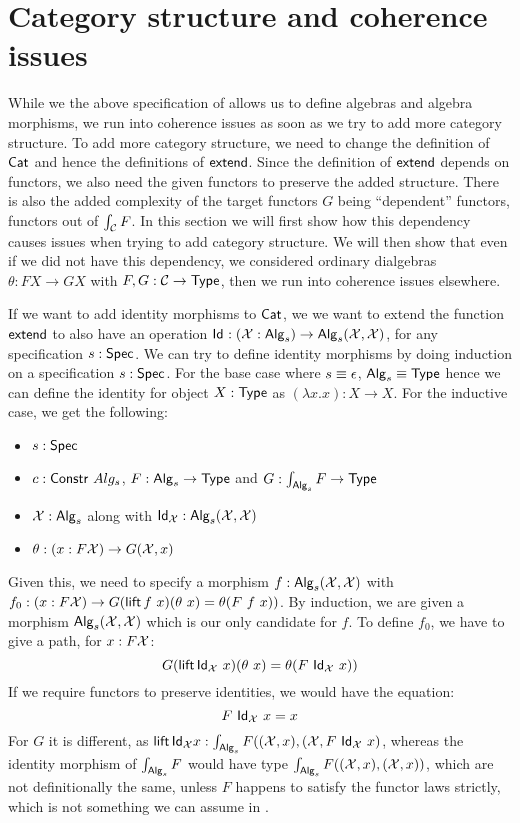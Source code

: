 \documentclass[a4paper,10pt]{report}
\begin{document}
\section{Category structure and coherence issues}
\label{sec:hitscategory}

While we the above specification of \hits allows us to define algebras
and algebra morphisms, we run into coherence issues as soon as we try
to add more category structure. To add more category structure, we
need to change the definition of $\mathsf{Cat}$ and hence the definitions of
$\mathsf{extend}$. Since the definition of $\mathsf{extend}$ depends on functors, we
also need the given functors to preserve the added structure. There is
also the added complexity of the target functors $G$ being
``dependent'' functors, \ie functors out of $\int_{\mathcal{C}} F$. In this
section we will first show how this dependency causes issues when
trying to add category structure. We will then show that even if we
did not have this dependency, \ie we considered ordinary dialgebras
$\theta : F X \to G X$ with $F, G : \mathcal{C} \to \mathsf{Type}$, then we run into
coherence issues elsewhere.

If we want to add identity morphisms to $\mathsf{Cat}$, we we want to extend
the function $\mathsf{extend}$ to also have an operation
$\mathsf{Id}_{} : (\mathcal{X} : \mathsf{Alg}_s) \to \mathsf{Alg}_s(\mathcal{X},\mathcal{X})$, for any
specification $s : \mathsf{Spec}$. We can try to define identity morphisms by
doing induction on a specification $s : \mathsf{Spec}$. For the base case
where $s \equiv \epsilon$, $\mathsf{Alg}_s \equiv \mathsf{Type}$ hence we can define
the identity for object $X : \mathsf{Type}$ as $(\lambda x . x) : X \to X$. For
the inductive case, we get the following:
%
\begin{itemize}
\item $s : \mathsf{Spec}$ 
\item $c : \mathsf{Constr}\ Alg_s$, \ie $F : \mathsf{Alg}_s \to \mathsf{Type}$ and $G : \int_{\mathsf{Alg}_s} F \to \mathsf{Type}$
\item $\mathcal{X} : \mathsf{Alg}_s$ along with
  $\mathsf{Id}_{\mathcal{X}} : \mathsf{Alg}_s (\mathcal{X},\mathcal{X})$
\item  $\theta : (x : F \mathcal{X}) \to G (\mathcal{X}, x)$
\end{itemize}
%
Given this, we need to specify a morphism
$f : \mathsf{Alg}_s (\mathcal{X},\mathcal{X})$ with
$f_0 : (x : F \alg{X}) \to G (\lift f\ x) (\theta\ x) = \theta (F\ f\
x))$.
By induction, we are given a morphism $\mathsf{Alg}_s (\mathcal{X},\mathcal{X})$ which
is our only candidate for $f$. To define $f_0$, we have to give a path, for $x : F \mathcal{X}$:
$$
G (\operatorname{\mathsf{lift}} \mathsf{Id}_{\mathcal{X}}\ x) (\theta\ x) = \theta (F\ \mathsf{Id}_{\mathcal{X}}\ x))
$$
If we require functors to preserve identities, we would have the equation:
$$
F\ \mathsf{Id}_{\mathcal{X}}\ x = x
$$
For $G$ it is different, as
$\operatorname{\mathsf{lift}} \mathsf{Id}_{\mathcal{X}} x : \int_{\mathsf{Alg}_s} F ((\mathcal{X},x), (\mathcal{X}, F\
\mathsf{Id}_{\mathcal{X}}\ x)$,
whereas the identity morphism of $\int_{\mathsf{Alg}_s} F$ would have type
$\int_{\mathsf{Alg}_s} F ((\mathcal{X},x),(\mathcal{X},x))$, which are not
definitionally the same, unless $F$ happens to satisfy the functor
laws strictly, which is not something we can assume in \mltt.
\end{document}
